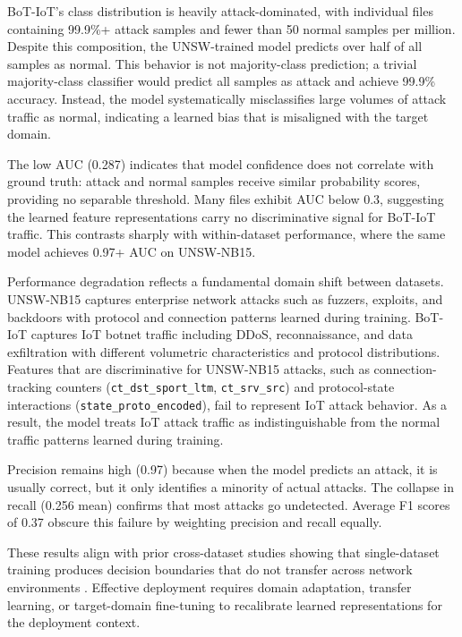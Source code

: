 \documentclass[pdflatex,sn-mathphys-num]{sn-jnl}
\theoremstyle{thmstyleone}%
\theoremstyle{thmstyletwo}%
\theoremstyle{thmstylethree}%
\begin{document}
BoT-IoT’s class distribution is heavily attack-dominated, with individual files containing 99.9\%+ attack samples and fewer than 50 normal samples per million. Despite this composition, the UNSW-trained model predicts over half of all samples as normal. This behavior is not majority-class prediction; a trivial majority-class classifier would predict all samples as attack and achieve 99.9\% accuracy. Instead, the model systematically misclassifies large volumes of attack traffic as normal, indicating a learned bias that is misaligned with the target domain.

The low AUC (0.287) indicates that model confidence does not correlate with ground truth: attack and normal samples receive similar probability scores, providing no separable threshold. Many files exhibit AUC below 0.3, suggesting the learned feature representations carry no discriminative signal for BoT-IoT traffic. This contrasts sharply with within-dataset performance, where the same model achieves 0.97+ AUC on UNSW-NB15.

Performance degradation reflects a fundamental domain shift between datasets. UNSW-NB15 captures enterprise network attacks such as fuzzers, exploits, and backdoors with protocol and connection patterns learned during training. BoT-IoT captures IoT botnet traffic including DDoS, reconnaissance, and data exfiltration with different volumetric characteristics and protocol distributions. Features that are discriminative for UNSW-NB15 attacks, such as connection-tracking counters (\texttt{ct\_dst\_sport\_ltm}, \texttt{ct\_srv\_src}) and protocol-state interactions (\texttt{state\_proto\_encoded}), fail to represent IoT attack behavior. As a result, the model treats IoT attack traffic as indistinguishable from the normal traffic patterns learned during training.

Precision remains high (0.97) because when the model predicts an attack, it is usually correct, but it only identifies a minority of actual attacks. The collapse in recall (0.256 mean) confirms that most attacks go undetected. Average F1 scores of 0.37 obscure this failure by weighting precision and recall equally.

These results align with prior cross-dataset studies showing that single-dataset training produces decision boundaries that do not transfer across network environments \cite{Layeghy2022}\cite{Zhang2023}. Effective deployment requires domain adaptation, transfer learning, or target-domain fine-tuning to recalibrate learned representations for the deployment context.
\end{document}
